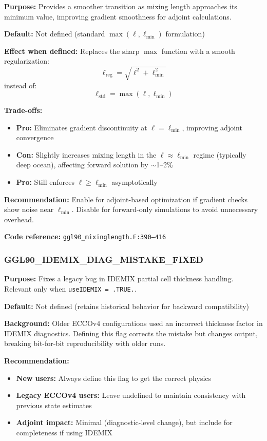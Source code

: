 \documentclass[12pt,letterpaper]{article}
\begin{document}
\textbf{Purpose:} Provides a smoother transition as mixing length approaches its minimum value, improving gradient smoothness for adjoint calculations.

\textbf{Default:} Not defined (standard $\max(\ell, \ell_{\mathrm{min}})$ formulation)

\textbf{Effect when defined:} Replaces the sharp $\max$ function with a smooth regularization:
\[
\ell_{\mathrm{reg}} = \sqrt{\ell^2 + \ell_{\mathrm{min}}^2}
\]
instead of:
\[
\ell_{\mathrm{std}} = \max(\ell, \ell_{\mathrm{min}})
\]

\textbf{Trade-offs:}
\begin{itemize}[leftmargin=*]
  \item \textbf{Pro:} Eliminates gradient discontinuity at $\ell = \ell_{\mathrm{min}}$, improving adjoint convergence
  \item \textbf{Con:} Slightly increases mixing length in the $\ell \approx \ell_{\mathrm{min}}$ regime (typically deep ocean), affecting forward solution by $\sim$1--2\%
  \item \textbf{Pro:} Still enforces $\ell \geq \ell_{\mathrm{min}}$ asymptotically
\end{itemize}

\textbf{Recommendation:} Enable for adjoint-based optimization if gradient checks show noise near $\ell_{\mathrm{min}}$. Disable for forward-only simulations to avoid unnecessary overhead.

\textbf{Code reference:} \texttt{ggl90\_mixinglength.F:390--416}

\subsubsection{GGL90\_IDEMIX\_DIAG\_MISTAKE\_FIXED}

\textbf{Purpose:} Fixes a legacy bug in IDEMIX partial cell thickness handling. Relevant only when \texttt{useIDEMIX = .TRUE.}.

\textbf{Default:} Not defined (retains historical behavior for backward compatibility)

\textbf{Background:} Older ECCOv4 configurations used an incorrect thickness factor in IDEMIX diagnostics. Defining this flag corrects the mistake but changes output, breaking bit-for-bit reproducibility with older runs.

\textbf{Recommendation:}
\begin{itemize}[leftmargin=*]
  \item \textbf{New users:} Always define this flag to get the correct physics
  \item \textbf{Legacy ECCOv4 users:} Leave undefined to maintain consistency with previous state estimates
  \item \textbf{Adjoint impact:} Minimal (diagnostic-level change), but include for completeness if using IDEMIX
\end{itemize}
\end{document}
